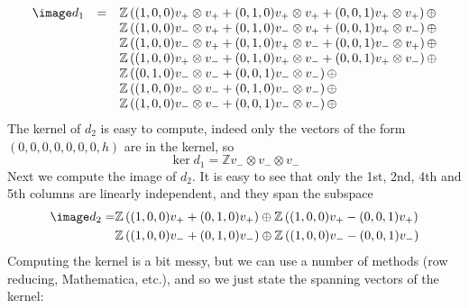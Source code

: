\begin{align}
\label{image d1}
\begin{array}{rcl}
\image d_1 &=& \mathbb Z \left( (1,0,0)v_+ \otimes v_+ + (0,1,0)v_+ \otimes v_+ + (0,0,1)v_+ \otimes v_+ \right) \oplus \\
           & & \mathbb Z \left( (1,0,0)v_- \otimes v_+ + (0,1,0)v_- \otimes v_+ + (0,0,1)v_+ \otimes v_- \right) \oplus \\
           & & \mathbb Z \left( (1,0,0)v_- \otimes v_+ + (0,1,0)v_+ \otimes v_- + (0,0,1)v_- \otimes v_+ \right) \oplus \\
           & & \mathbb Z \left( (1,0,0)v_+ \otimes v_- + (0,1,0)v_+ \otimes v_- + (0,0,1)v_+ \otimes v_- \right) \oplus \\
           & & \mathbb Z \left( (0,1,0)v_- \otimes v_- + (0,0,1)v_- \otimes v_- \right) \oplus \\
           & & \mathbb Z \left( (1,0,0)v_- \otimes v_- + (0,1,0)v_- \otimes v_- \right) \oplus \\
           & & \mathbb Z \left( (1,0,0)v_- \otimes v_- + (0,0,1)v_- \otimes v_- \right) \oplus 
\end{array}
\end{align}
The kernel of $d_2$ is easy to compute, indeed only the vectors of the form $(0,0,0,0,0,0,0,h)$ are in the kernel, so
\[ \ker d_1 = \mathbb Z v_- \otimes v_- \otimes v_- \]
Next we compute the image of $d_2$. It is easy to see that only the 1st, 2nd, 4th and 5th columns are linearly independent, and they span the subspace
\begin{align*}
\image d_2 =& \mathbb Z \left( (1,0,0) v_+ + (0,1,0) v_+ \right) \oplus \mathbb Z \left( (1,0,0) v_+  - (0,0,1) v_+ \right) \\
            & \mathbb Z \left( (1,0,0) v_- + (0,1,0) v_- \right) \oplus \mathbb Z \left( (1,0,0) v_-  - (0,0,1) v_- \right) 
\end{align*}
Computing the kernel is a bit messy, but we can use a number of methods (row reducing, Mathematica, etc.), and so we just state the spanning vectors of the kernel:
